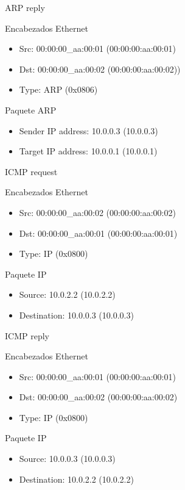 \documentclass[a4paper,11pt]{article} %
\begin{document}
\setlength{\leftskip}{1cm}ARP reply\par
\indent\indent Encabezados Ethernet
\begin{itemize}
    \setlength{\itemindent}{80px}
    \item Src: 00:00:00\_aa:00:01 (00:00:00:aa:00:01)
    \item Dst: 00:00:00\_aa:00:02 (00:00:00:aa:00:02))
    \item Type: ARP (0x0806)
\end{itemize}

\indent\indent Paquete ARP
\begin{itemize}
    \setlength{\itemindent}{80px}
    \item Sender IP address: 10.0.0.3 (10.0.0.3)
    \item Target IP address: 10.0.0.1 (10.0.0.1)
\end{itemize}

\setlength{\leftskip}{1cm}ICMP request

\indent\indent Encabezados Ethernet
\begin{itemize}
    \setlength{\itemindent}{80px}
    \item Src: 00:00:00\_aa:00:02 (00:00:00:aa:00:02)
    \item Dst: 00:00:00\_aa:00:01 (00:00:00:aa:00:01)
    \item Type: IP (0x0800)
\end{itemize}

\indent\indent Paquete IP
\begin{itemize}
    \setlength{\itemindent}{80px}
    \item Source: 10.0.2.2 (10.0.2.2)
    \item Destination: 10.0.0.3 (10.0.0.3)
\end{itemize}

\setlength{\leftskip}{1cm}ICMP reply

\indent\indent Encabezados Ethernet
\begin{itemize}
    \setlength{\itemindent}{80px}
    \item Src: 00:00:00\_aa:00:01 (00:00:00:aa:00:01)
    \item Dst: 00:00:00\_aa:00:02 (00:00:00:aa:00:02)
    \item Type: IP (0x0800)
\end{itemize}

\indent\indent Paquete IP
\begin{itemize}
    \setlength{\itemindent}{80px}
    \item Source: 10.0.0.3 (10.0.0.3)
    \item Destination: 10.0.2.2 (10.0.2.2)
\end{itemize}
\end{document}
